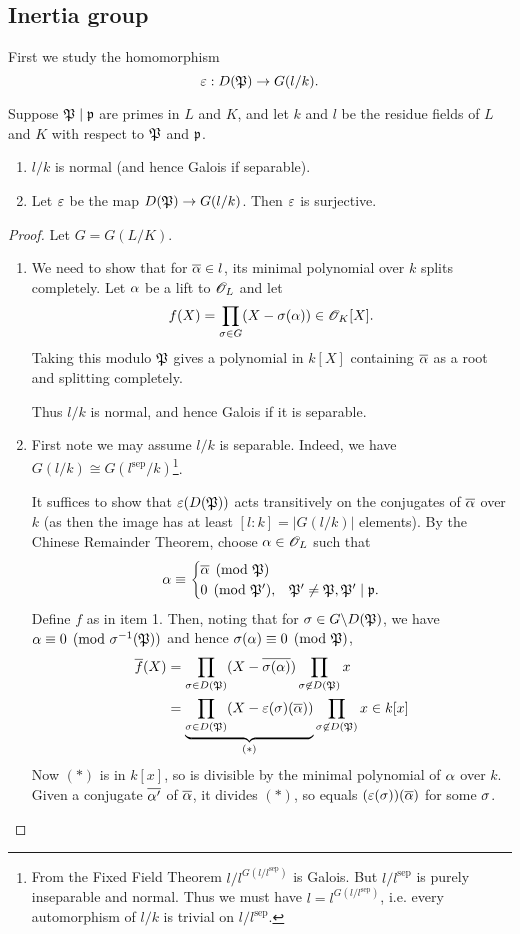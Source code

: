\subsection{Inertia group}
First we study the homomorphism
\[
\varepsilon: D(\mathfrak{P})\to G(l/k).
\]
\begin{pr}
Suppose $\mathfrak{P}\mid \mathfrak{p}$ are primes in $L$ and $K$, and 
let $k$ and $l$ be the residue fields of $L$ and $K$ with respect to $\mathfrak{P}$ and $\mathfrak{p}$.
\begin{enumerate}
\item $l/k$ is normal (and hence Galois if separable).
\item Let $\varepsilon$ be the map $D(\mathfrak{P})\to G(l/k)$. Then $\varepsilon$ is surjective.
\end{enumerate}
\end{pr}
\begin{proof}
Let $G=G(L/K)$.
\begin{enumerate}
\item We need to show that for $\overline{\alpha}\in l$, its minimal polynomial over $k$ splits completely. Let $\alpha$ be a lift to $\mathscr{O}_L$ and let 
\[f(X)=\prod_{\sigma\in G} (X-\sigma(\alpha))\in \mathscr{O}_K[X].\]
Taking this modulo $\mathfrak{P}$ gives a polynomial in $k[X]$ containing $\overline{\alpha}$ as a root and splitting completely.

Thus $l/k$ is normal, and hence Galois if it is separable.
\item First note we may assume $l/k$ is separable. Indeed, we have $G(l/k)\cong G(l^{\text{sep}}/k)$\footnote{From the Fixed Field Theorem $l/l^{G(l/l^{\text{sep}})}$ is Galois. 
But $l/l^{\text{sep}}$ is purely inseparable and normal.  
Thus we must have $l=l^{G(l/l^{\text{sep}})}$, i.e. every automorphism of $l/k$ is trivial on $l/l^{\text{sep}}$.}.

It suffices to show that $\varepsilon(D(\mathfrak{P}))$ acts transitively on the conjugates of $\overline{\alpha}$ over $k$ (as then the image has at least $[l:k]=|G(l/k)|$ elements).
By the Chinese Remainder Theorem, choose $\alpha\in \mathscr{O}_L$ such that 
\[
\alpha\equiv \begin{cases}
\overline{\alpha}\pmod{\mathfrak{P}}\\
0\pmod{\mathfrak{P}'},&\mathfrak{P}'\ne \mathfrak{P}, \mathfrak{P}'\mid \mathfrak{p}.
\end{cases}
\]
Define $f$ as in item 1. Then, noting that for $\sigma\in G\backslash D(\mathfrak{P})$, we have $\alpha\equiv 0\pmod{\sigma^{-1}(\mathfrak{P})}$ and hence $\sigma(\alpha)\equiv 0\pmod{\mathfrak{P}}$, 
\begin{align*}
\overline{f}(X)&=\prod_{\sigma\in D(\mathfrak{P})}(X-\overline{\sigma(\alpha)})\prod_{\sigma\not\in D(\mathfrak{P})} x\\
&=\underbrace{\prod_{\sigma\in D(\mathfrak{P})} (X-\varepsilon(\sigma)(\overline{\alpha}))}_{(*)}\prod_{\sigma\not\in D(\mathfrak{P})} x\in k[x]
\end{align*}
Now $(*)$ is in $k[x]$, so is divisible by the minimal polynomial of $\alpha$ over $k$. Given a conjugate $\overline{\alpha'}$ of $\overline{\alpha}$, it divides $(*)$, so equals $(\varepsilon(\sigma))(\overline{\alpha})$ for some $\sigma$.\qedhere
\end{enumerate}
\end{proof}
